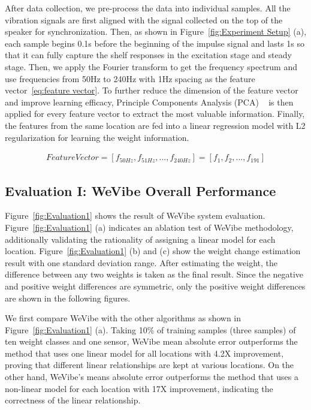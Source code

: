 After data collection, we pre-process the data into individual samples. All the vibration signals are first aligned with the signal collected on the top of the speaker for synchronization. Then, as shown in Figure~\ref{fig:Experiment Setup} (a), each sample begins 0.1s before the beginning of the impulse signal and lasts 1s so that it can fully capture the shelf responses in the excitation stage and steady stage\cite{huang2020vibration}. Then, we apply the Fourier transform to get the frequency spectrum and use frequencies from 50Hz to 240Hz with 1Hz spacing as the feature vector~\ref{eq:feature vector}. To further reduce the dimension of the feature vector and improve learning efficacy, Principle Components Analysis (PCA) ~\cite{mackiewicz1993principal} is then applied for every feature vector to extract the most valuable information. Finally, the features from the same location are fed into a linear regression model with L2 regularization for learning the weight information.

\begin{equation}
\begin{gathered}
Feature Vector = [f_{50Hz},f_{51Hz},...,f_{240Hz}] = [f_1,f_2,...,f_{191}]
\label{eq:feature vector}
\end{gathered}
\end{equation}

\subsection{Evaluation I: WeVibe Overall Performance}
\label{eval:System}
Figure~\ref{fig:Evaluation1} shows the result of WeVibe system evaluation. Figure~\ref{fig:Evaluation1} (a) indicates an ablation test of WeVibe methodology, additionally validating the rationality of assigning a linear model for each location. Figure~\ref{fig:Evaluation1} (b) and (c) show the weight change estimation result with one standard deviation range. After estimating the weight, the difference between any two weights is taken as the final result. Since the negative and positive weight differences are symmetric, only the positive weight differences are shown in the following figures.

We first compare WeVibe with the other algorithms as shown in Figure~\ref{fig:Evaluation1} (a). Taking 10\% of training samples (three samples) of ten weight classes and one sensor, WeVibe mean absolute error outperforms the method that uses one linear model for all locations with 4.2X improvement, proving that different linear relationships are kept at various locations. On the other hand, WeVibe's means absolute error outperforms the method that uses a non-linear model for each location with 17X improvement, indicating the correctness of the linear relationship. 

